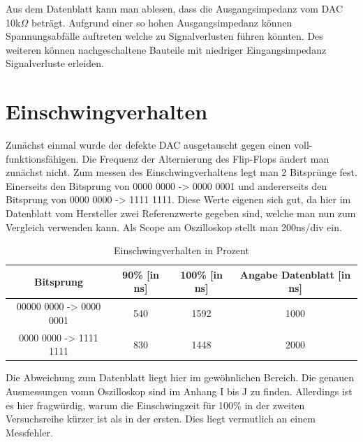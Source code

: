 Aus dem Datenblatt kann man ablesen, dass die Ausgangsimpedanz vom
DAC 10k$\Omega$ beträgt. Aufgrund einer so hohen Ausgangsimpedanz 
können Spannungsabfälle auftreten welche zu Signalverlusten führen 
könnten. Des weiteren können nachgeschaltene Bauteile mit niedriger
Eingangsimpedanz Signalverluste erleiden.




\section{Einschwingverhalten}

Zunächst einmal wurde der defekte DAC ausgetauscht 
gegen einen voll-funktionsfähigen. \newline
Die Frequenz der Alternierung des Flip-Flops ändert man zunächst nicht. \newline
Zum messen des Einschwingverhaltens legt man 2 Bitsprünge fest.
Einerseits den Bitsprung von 0000 0000 -> 0000 0001 und andererseits 
den Bitsprung von 0000 0000 -> 1111 1111.
Diese Werte eigenen sich gut, da hier im Datenblatt vom Hersteller 
zwei Referenzwerte gegeben sind, welche man nun zum Vergleich verwenden kann.\newline
Als Scope am Oszilloskop stellt man 200ns/div ein. \newline

\begin{table}[h]
	\centering
	\begin{tabular}[h]{c|c|c|c}
		Bitsprung & 90\% [in ns] & 100\% [in ns] & Angabe Datenblatt [in ns] \\
		\hline
		00000 0000 -> 0000 0001 & 540 & 1592 & 1000\\
		\hline
		0000 0000 -> 1111 1111 & 830 & 1448 & 2000\\
	\end{tabular}
	\caption{Einschwingverhalten in Prozent}
	\label{tab:Einschwingverhalten}
\end{table}

Die Abweichung zum Datenblatt liegt hier im gewöhnlichen Bereich.
Die genauen Ausmessungen vomn Oszilloskop sind im Anhang I bis J zu finden.
Allerdings ist es hier fragwürdig, warum die Einschwingzeit für 100\% in der
zweiten Versuchsreihe kürzer ist als in der ersten. Dies liegt vermutlich an
einem Messfehler. \newline 


